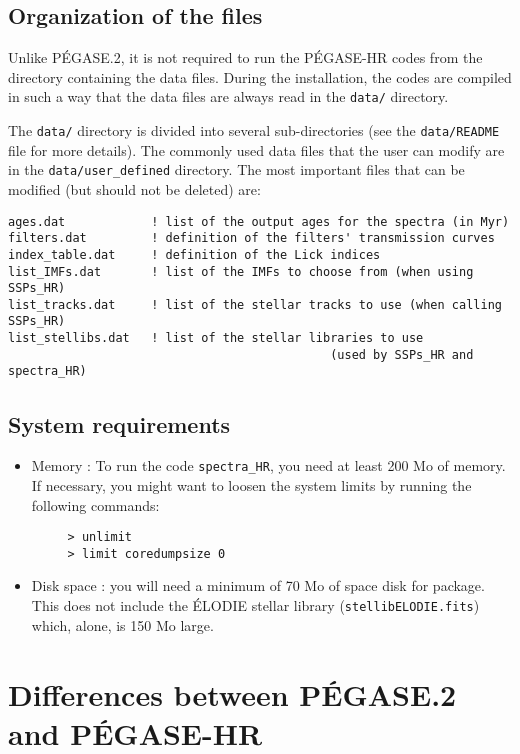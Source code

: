 \documentclass[11pt,fleqn]{article}
\begin{document}
\subsection{Organization of the files}
Unlike P\'EGASE.2, it is not required to run the P\'EGASE-HR codes
from the directory containing the data files.  During the
installation, the codes are compiled in such a way that the data files
are always read in the \texttt{data/} directory.

The \texttt{data/} directory is divided into several sub-directories
(see the \texttt{data/README} file for more details).  The commonly
used data files that the user can modify are in the
\texttt{data/user\_defined} directory. The most important files that
can be modified (but should not be deleted) are:
\begin{verbatim}
ages.dat            ! list of the output ages for the spectra (in Myr)
filters.dat         ! definition of the filters' transmission curves
index_table.dat     ! definition of the Lick indices
list_IMFs.dat       ! list of the IMFs to choose from (when using SSPs_HR)
list_tracks.dat     ! list of the stellar tracks to use (when calling SSPs_HR)
list_stellibs.dat   ! list of the stellar libraries to use 
                                             (used by SSPs_HR and spectra_HR)
\end{verbatim}


\subsection{System requirements}
\begin{itemize}
\item{Memory} :
To run the code \texttt{spectra\_HR}, you need at least 200 Mo of memory.
If necessary, you might want to loosen the system limits by running the following commands:
\begin{verbatim}
     > unlimit
     > limit coredumpsize 0
\end{verbatim}
\item{Disk space} : you will need a minimum of 70 Mo of space disk for
package. This does not include the \'ELODIE stellar library
(\texttt{stellibELODIE.fits}) which, alone, is 150 Mo large.
\end{itemize}

\section{Differences between P\'EGASE.2 and P\'EGASE-HR}
\end{document}
